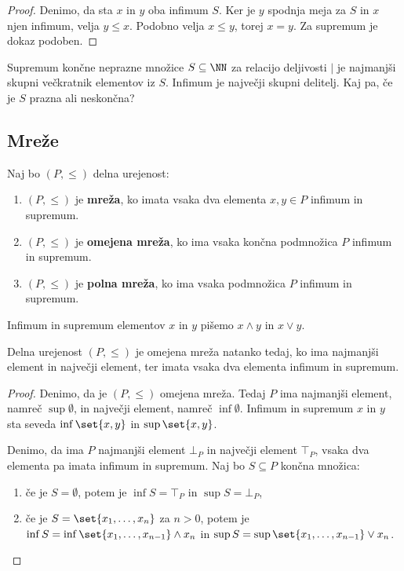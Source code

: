 \begin{proof}
  Denimo, da sta $x$ in $y$ oba infimum $S$. Ker je $y$ spodnja meja za
  $S$ in $x$ njen infimum, velja $y \leq x$. Podobno velja $x \leq y$, torej $x = y$. Za
  supremum je dokaz podoben.
\end{proof}

\begin{zgled}
  Supremum končne neprazne množice $S \subseteq \NN$ za relacijo deljivosti $\mid$
  je najmanjši skupni večkratnik elementov iz $S$. Infimum je največji skupni
  delitelj. Kaj pa, če je $S$ prazna ali neskončna?
\end{zgled}

\subsection{Mreže}

\begin{definicija}
  Naj bo $(P, {\leq})$ delna urejenost:
  \begin{enumerate}
  \item $(P, \leq)$ je \textbf{mreža}, ko imata vsaka dva elementa $x, y \in P$ infimum in supremum.

  \item $(P, \leq)$ je \textbf{omejena mreža}, ko ima vsaka končna podmnožica $P$ infimum in supremum.

  \item $(P, \leq)$ je \textbf{polna mreža}, ko ima vsaka podmnožica $P$ infimum in supremum.
  \end{enumerate}
  Infimum in supremum elementov $x$ in $y$ pišemo $x \land y$ in $x \lor y$.
\end{definicija}

\begin{izrek}
  Delna urejenost $(P, {\leq})$ je omejena mreža natanko tedaj, ko ima
  najmanjši element in največji element, ter imata vsaka dva elementa infimum in supremum.
\end{izrek}

\begin{proof}
  Denimo, da je $(P, \leq)$ omejena mreža. Tedaj $P$ ima najmanjši element, namreč
  $\sup \emptyset$, in največji element, namreč $\inf \emptyset$. Infimum in supremum $x$ in $y$ sta seveda $\inf \set{x, y}$ in $\sup \set{x, y}$.

  Denimo, da ima $P$ najmanjši element $\bot_P$ in največji element $\top_P$, vsaka dva
  elementa pa imata infimum in supremum. Naj bo $S \subseteq P$ končna množica:
  \begin{enumerate}
  \item če je $S = \emptyset$, potem je $\inf S = \top_P$ in $\sup S = \bot_P$,
  \item če je $S = \set{x_1, \ldots, x_n}$ za $n > 0$, potem je $\inf S = \inf \set{x_1, \ldots, x_{n-1}} \land x_n$ in $\sup S = \sup \set{x_1, \ldots, x_{n-1}} \lor x_n$.
  \end{enumerate}
\end{proof}

